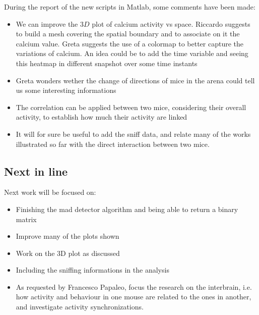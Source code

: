 \documentclass[a4paper]{article}
\begin{document}
\begin{itemize}
		During the report of the new scripts in Matlab, some comments have been made:
		
		\begin{itemize}
			
			\item We can improve the $3D$ plot of calcium activity vs space. Riccardo suggests to build a mesh covering the spatial boundary and to associate on it the calcium value. Greta suggests the use of a colormap to better capture the variations of calcium. An idea could be to add the time variable and seeing this heatmap in different snapshot over some time instants
			
			\item Greta wonders wether the change of directions of mice in the arena could tell us some interesting informations
			
			\item The correlation can be applied between two mice, considering their overall activity, to establish how much their activity are linked
			
			\item It will for sure be useful to add the sniff data, and relate many of the works illustrated so far with the direct interaction between two mice.
			
			
		\end{itemize} 
		
		
		\subsection{Next in line}
		
		Next work will be focused on:
		
		\begin{itemize}
			
			\item Finishing the mad detector algorithm and being able to return a binary matrix
			
			\item Improve many of the plots shown
			
			\item Work on the 3D plot as discussed
			
			\item Including the sniffing informations in the analysis
			
			\item As requested by Francesco Papaleo, focus the research on the interbrain, i.e. how activity and behaviour in one mouse are related to the ones in another, and investigate activity synchronizations.
			
			
		\end{itemize}
		
	\end{itemize}
	
\end{document}
